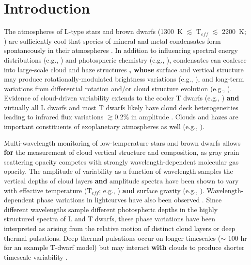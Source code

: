 \documentclass[twocolumn]{aastex6}
\newcommand{\teff}{T$_{eff}$}
\begin{document}



\section{Introduction}

The atmospheres of L-type stars and brown dwarfs (1300~K $\lesssim$ {\teff} $\lesssim$ 2200~K; \citealt{2015ApJ...810..158F}) are sufficiently cool that species of mineral and metal condensates form spontaneously in their atmospheres \citep{1996A&A...305L...1T,2010ApJ...716.1060V}.
In addition to influencing spectral energy distributions (e.g., \citealt{2001ApJ...556..357A,2008ApJ...674..451B}) and photospheric chemistry (e.g., \citealt{2000ApJ...531..438B}), condensates can coalesce into large-scale cloud and haze structures \citep{1989ApJ...338..314L,2001ApJ...556..872A,2014Natur.505..654C}\textbf{,
whose} surface and vertical structure may produce rotationally-modulated brightness variations (e.g., \citealt{2012ApJ...750..105R}), and long-term variations from differential rotation and/or cloud structure evolution (e.g., \citealt{2009ApJ...701.1534A,2013A&A...555L...5G,2016ApJ...826....8Y}). Evidence of cloud-driven variability extends to the cooler T dwarfs (e.g., \citealt{2009ApJ...701.1534A,2012ApJ...760L..31B,2015ApJ...799..154M}) \textbf{and} virtually all L dwarfs and most T dwarfs likely have cloud deck heterogeneities leading to infrared flux variations $\gtrsim$0.2\% in amplitude \citep{2015ApJ...799..154M}. Clouds and hazes are important constituents of exoplanetary atmospheres as well (e.g., \citealt{2011ApJ...733...65B,2014Natur.505...69K,2016Natur.529...59S}).

Multi-wavelength monitoring of low-temperature stars and brown dwarfs allows \textbf{for} the measurement of cloud vertical structure and composition, as gray grain scattering opacity competes with strongly wavelength-dependent molecular gas opacity. The amplitude of variability as a function of wavelength samples the vertical depths of cloud layers \citep{2013ApJ...768..121A} \textbf{and} amplitude spectra have been shown to vary with effective temperature ({\teff}; e.g., \citealt{2015ApJ...798L..13Y}) \textbf{and} surface gravity (e.g., \citealt{2016ApJ...829L..32L}).
Wavelength-dependent phase variations in lightcurves have also been observed \citep{2012ApJ...760L..31B,2013ApJ...778L..10B,2016ApJ...826....8Y}.
Since different wavelengths sample different photospheric depths in the highly structured spectra of L and T dwarfs, these phase variations have been interpreted as arising from the relative motion of distinct cloud layers or deep thermal pulsations. Deep thermal pulsations occur on longer timescales ($\sim$ 100 hr for an example T-dwarf model) but may interact \textbf{with} clouds to produce shorter timescale variability \citep{2014ApJ...785..158R}.
\end{document}
